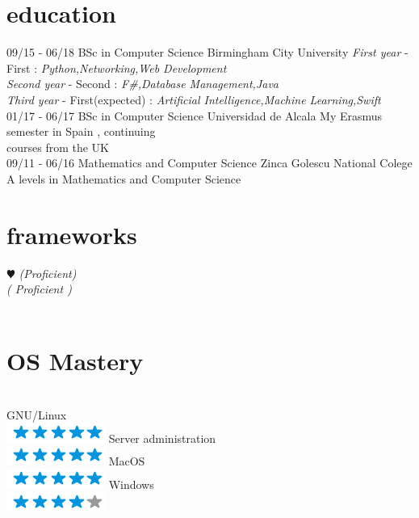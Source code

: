 \documentclass[]{friggeri-cv}
\begin{document}
\section{education}
\begin{entrylist}
  \entry
  {09/15 - 06/18}
  {BSc in Computer Science}
  {Birmingham City University}
  {
        \emph{First year }- First : \emph{Python,Networking,Web Development} \\
        \emph{Second year } - Second : \emph{F\#,Database Management,Java} \\ 
        \emph{Third year }- First(expected) : \emph{Artificial Intelligence,Machine Learning,Swift}
  }
  \\
  \entry
  {01/17 - 06/17}
  {BSc in Computer Science }
  {Universidad de Alcala}
  {My Erasmus semester in Spain , continuing \\courses from the UK
  }
  \\
  \entry
  {09/11 - 06/16}
  {Mathematics and Computer Science}
  {Zinca Golescu National Colege}
  {A levels in Mathematics and Computer Science}

  \end{entrylist}


\newpage

\begin{aside2}
  \section{frameworks}
    {\color{red} $\varheartsuit$} 
     \emph{(Proficient)} \\
     \emph{( Proficient )} \\
     \\
    
  \section{OS Mastery}
  \\GNU/Linux  \\\includegraphics[scale=0.30]{img/5stars.png}
  Server administration \\\includegraphics[scale=0.30]{img/5stars.png}
  MacOS  \\\includegraphics[scale=0.30]{img/5stars.png}
  Windows  \\\includegraphics[scale=0.30]{img/4stars.png}
\end{aside2}
\end{document}

